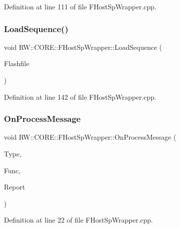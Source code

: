 Definition at line 111 of file F\+Host\+Sp\+Wrapper.\+cpp.

\hypertarget{class_r_w_1_1_c_o_r_e_1_1_f_host_sp_wrapper_a5d384a433b333b1f5f7b7465ad138d4c}{}\label{class_r_w_1_1_c_o_r_e_1_1_f_host_sp_wrapper_a5d384a433b333b1f5f7b7465ad138d4c} 
\subsubsection{\texorpdfstring{Load\+Sequence()}{LoadSequence()}}
{\footnotesize\ttfamily void R\+W\+::\+C\+O\+R\+E\+::\+F\+Host\+Sp\+Wrapper\+::\+Load\+Sequence (\begin{DoxyParamCaption}\item[{const Q\+File \&}]{Flashfile }\end{DoxyParamCaption})}



Definition at line 142 of file F\+Host\+Sp\+Wrapper.\+cpp.

\hypertarget{class_r_w_1_1_c_o_r_e_1_1_f_host_sp_wrapper_a60128d89802ee6ded357d3bfee856625}{}\label{class_r_w_1_1_c_o_r_e_1_1_f_host_sp_wrapper_a60128d89802ee6ded357d3bfee856625} 
\subsubsection{\texorpdfstring{On\+Process\+Message}{OnProcessMessage}}
{\footnotesize\ttfamily void R\+W\+::\+C\+O\+R\+E\+::\+F\+Host\+Sp\+Wrapper\+::\+On\+Process\+Message (\begin{DoxyParamCaption}\item[{Util\+::\+Message\+Receiver}]{Type,  }\item[{Util\+::\+Functions}]{Func,  }\item[{Q\+Byte\+Array}]{Report }\end{DoxyParamCaption})\hspace{0.3cm}{\ttfamily [slot]}}



Definition at line 22 of file F\+Host\+Sp\+Wrapper.\+cpp.

